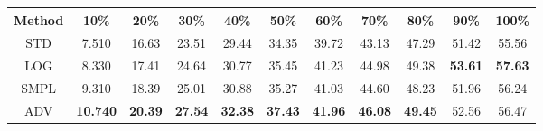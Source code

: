 \documentclass{standalone}
\begin{document}
\begin{tabular}{c|cccccccccc}
      \toprule
      Method & 10\% & 20\% & 30\% & 40\% & 50\% & 60\% & 70\% & 80\% & 90\% & 100\% \\
      \midrule
STD & 7.510 & 16.63 & 23.51 & 29.44 & 34.35 & 39.72 & 43.13 & 47.29 & 51.42 & 55.56\\
LOG & 8.330 & 17.41 & 24.64 & 30.77 & 35.45 & 41.23 & 44.98 & 49.38 & \textbf{53.61} & \textbf{57.63}\\
SMPL & 9.310 & 18.39 & 25.01 & 30.88 & 35.27 & 41.03 & 44.60 & 48.23 & 51.96 & 56.24\\
ADV & \textbf{10.740} & \textbf{20.39} & \textbf{27.54} & \textbf{32.38} & \textbf{37.43} & \textbf{41.96} & \textbf{46.08} & \textbf{49.45} & 52.56 & 56.47\\
  \bottomrule
\end{tabular}
\end{document}
